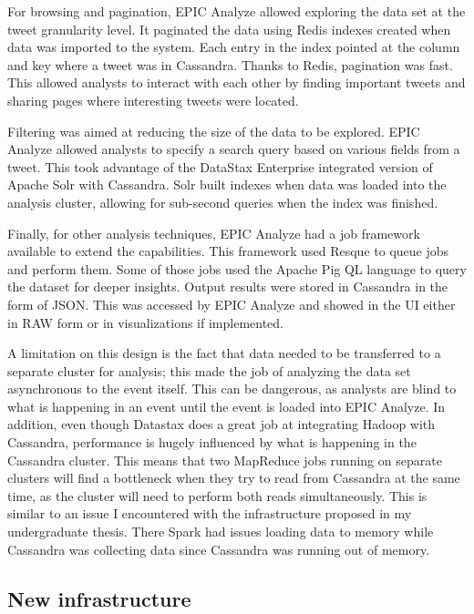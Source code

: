 For browsing and pagination, EPIC Analyze allowed exploring the data set at the tweet granularity level. It paginated the data using Redis indexes created when data was imported to the system. Each entry in the index pointed at the column and key where a tweet was in Cassandra. Thanks to Redis, pagination was fast. This allowed analysts to interact with each other by finding important tweets and sharing pages where interesting tweets were located.

Filtering was aimed at reducing the size of the data to be explored. EPIC Analyze allowed analysts to specify a search query based on various fields from a tweet. This took advantage of the DataStax Enterprise integrated version of Apache Solr with Cassandra. Solr built indexes when data was loaded into the analysis cluster, allowing for sub-second queries when the index was finished.

Finally, for other analysis techniques, EPIC Analyze had a job framework available to extend the capabilities. This framework used Resque to queue jobs and perform them. Some of those jobs used the Apache Pig QL language to query the dataset for deeper insights. Output results were stored in Cassandra in the form of JSON. This was accessed by EPIC Analyze and showed in the UI either in RAW form or in visualizations if implemented.

A limitation on this design is the fact that data needed to be transferred to a separate cluster for analysis; this made the job of analyzing the data set asynchronous to the event itself. This can be dangerous, as analysts are blind to what is happening in an event until the event is loaded into EPIC Analyze. In addition, even though Datastax does a great job at integrating Hadoop with Cassandra, performance is hugely influenced by what is happening in the Cassandra cluster. This means that two MapReduce jobs running on separate clusters will find a bottleneck when they try to read from Cassandra at the same time, as the cluster will need to perform both reads simultaneously. This is similar to an issue I encountered with the infrastructure proposed in my undergraduate thesis. There Spark had issues loading data to memory while Cassandra was collecting data since Cassandra was running out of memory.

\subsection{New infrastructure}

